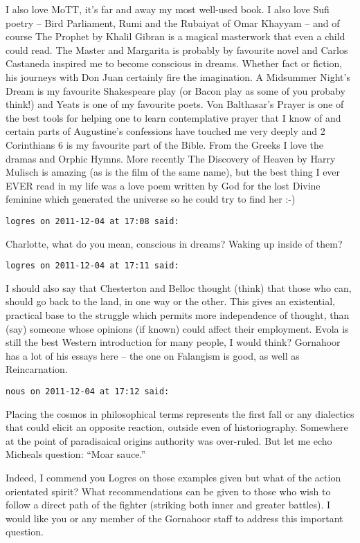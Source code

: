 \begin{footnotesize}
\begin{sffamily}
I also love MoTT, it's far and away my most well-used book. I also love Sufi poetry – Bird Parliament, Rumi and the Rubaiyat of Omar Khayyam – and of course The Prophet by Khalil Gibran is a magical masterwork that even a child could read. The Master and Margarita is probably by favourite novel and Carlos Castaneda inspired me to become conscious in dreams. Whether fact or fiction, his journeys with Don Juan certainly fire the imagination. A Midsummer Night's Dream is my favourite Shakespeare play (or Bacon play as some of you probaby think!) and Yeats is one of my favourite poets. Von Balthasar's Prayer is one of the best tools for helping one to learn contemplative prayer that I know of and certain parts of Augustine's confessions have touched me very deeply and 2 Corinthians 6 is my favourite part of the Bible. From the Greeks I love the dramas and Orphic Hymns. More recently The Discovery of Heaven by Harry Mulisch is amazing (as is the film of the same name), but the best thing I ever EVER read in my life was a love poem written by God for the lost Divine feminine which generated the universe so he could try to find her :-)


\hfill

\texttt{logres on 2011-12-04 at 17:08 said: }

Charlotte, what do you mean, conscious in dreams? Waking up inside of them?


\hfill

\texttt{logres on 2011-12-04 at 17:11 said: }

I should also say that Chesterton and Belloc thought (think) that those who can, should go back to the land, in one way or the other. This gives an existential, practical base to the struggle which permits more independence of thought, than (say) someone whose opinions (if known) could affect their employment. Evola is still the best Western introduction for many people, I would think? Gornahoor has a lot of his essays here – the one on Falangism is good, as well as Reincarnation.


\hfill

\texttt{nous on 2011-12-04 at 17:12 said: }

Placing the cosmos in philosophical terms represents the first fall or any dialectics that could elicit an opposite reaction, outside even of historiography. Somewhere at the point of paradisaical origins authority was over-ruled. But let me echo Micheals question: ``Moar sauce.''

Indeed, I commend you Logres on those examples given but what of the action orientated spirit? What recommendations can be given to those who wish to follow a direct path of the fighter (striking both inner and greater battles). I would like you or any member of the Gornahoor staff to address this important question.


\end{sffamily}
\end{footnotesize}
